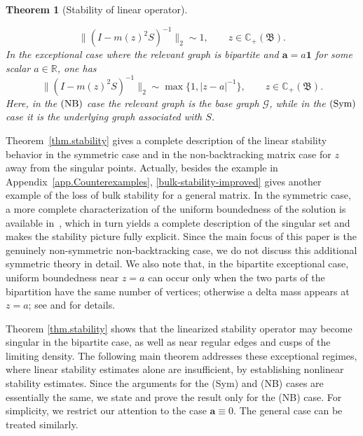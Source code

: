 \documentclass[11pt,twoside, a4paper]{article}
\numberwithin{equation}{section}
\numberwithin{figure}{section}
\theoremstyle{plain} %
\newtheorem{theorem}{Theorem}[section]
\theoremstyle{definition}
\theoremstyle{remark}
\newcommand{\1} {\mspace{1 mu}}
\newcommand{\2} {\mspace{2 mu}}
\newcommand{\R} {\mathbb{R}}
\newcommand{\C} {{\mathbb{C}}}
\begin{document}
\begin{theorem}[Stability of linear operator]
\begin{itemize}
\begin{equation}
          \|(I-m(z)^2S)^{-1}\|_2\sim 1,\qquad z\in\C_+(\mathfrak{B}).
        \end{equation}
        In the exceptional case where the relevant graph is bipartite and $\mathbf{a}=a\mathbf{1}$ for some scalar $a\in\R$, one has
        \begin{equation}\label{bulk-stability-improved}
          \|(I-m(z)^2S)^{-1}\|_2\sim \max\big\{1,|z-a|^{-1}\big\},\qquad z\in\C_+(\mathfrak{B}).
        \end{equation}
        Here, in the \(\textup{(NB)}\) case the relevant graph is the base graph
        \(\mathcal G\), while in the \(\textup{(Sym)}\) case it is the underlying
        graph associated with \(S\).
  \end{itemize}
\end{theorem}


Theorem~\ref{thm.stability} gives a complete description of the linear stability behavior in the
symmetric case and in the non-backtracking matrix case for $z$ away from the singular points. 
Actually, besides the example in Appendix~\ref{app.Counterexamples}, \eqref{bulk-stability-improved} gives another example of the loss of bulk stability for a general matrix.
In the symmetric case, a more complete characterization of the uniform boundedness of
the solution is available in~\cite[Section 6]{AEK2019quadratic}, which in turn yields a complete description of the
singular set and makes the stability picture fully explicit. Since the main focus of this paper is the genuinely non-symmetric non-backtracking case, we do not discuss this additional symmetric theory in detail. We also note that, in the bipartite exceptional case, uniform boundedness near \(z=a\) can occur only when the two parts of the bipartition have the same number of vertices; otherwise a delta mass appears at \(z=a\); see \cite[Example 7.3]{AvniBreuerSimon2020} and \cite[Section 3.1]{BanksGarzaVargasMukherjee2022} for details.

Theorem \ref{thm.stability} shows that the linearized stability operator may become singular in the bipartite case, as well as near regular edges and cusps of the limiting density. 
The following main theorem addresses these exceptional regimes, where linear stability estimates alone are insufficient, by establishing nonlinear stability estimates. 
Since the arguments for the (Sym) and (NB) cases are essentially the same, we state and prove the result only for the (NB) case. For simplicity, we restrict our attention to the case
$\mathbf a\equiv 0$. The general case can be treated similarly.
\end{document}
